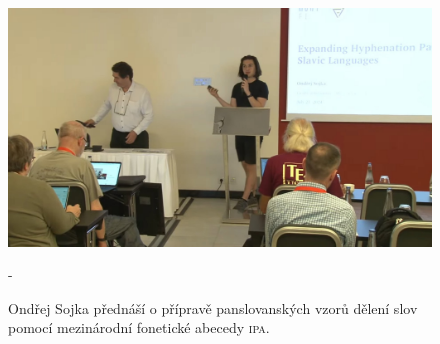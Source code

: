 \documentclass{csbulletin}
\newcommand\acro[1]{\textsc{\MakeLowercase{#1}}}
\begin{document}
\begin{figure}[p]
\centering
\includegraphics[width=\linewidth]{figs/petr-a-ondra-pred-prednaskou}\par\medskip
\fboxsep=0pt\kern-\fboxrule\relax{}%
\caption{Ondřej Sojka přednáší o přípravě panslovanských vzorů dělení slov pomocí mezinárodní fonetické abecedy \acro{IPA}.}
\label{fig:petr-a-ondra}
\end{figure}
\end{document}
